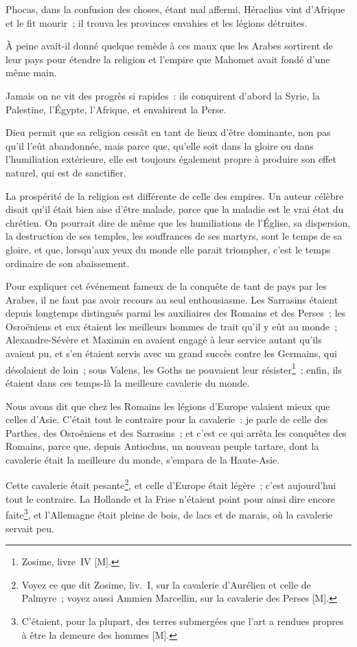 \documentclass[french,twoside]{book} %
\newcommand\chaptercont{} %
\begin{document}
\chaptercont
\noindent Phocas, dans la confusion des choses, étant mal affermi, Héraclius vint d’Afrique et le fit mourir ; il trouva les provinces envahies et les légions détruites.\par
À peine avait-il donné quelque remède à ces maux que les Arabes sortirent de leur pays pour étendre la religion et l’empire que Mahomet avait fondé d’une même main.\par
Jamais on ne vit des progrès si rapides : ils conquirent d’abord la Syrie, la Palestine, l’Égypte, l’Afrique, et envahirent la Perse.\par
Dieu permit que sa religion cessât en tant de lieux d’être dominante, non pas qu’il l’eût abandonnée, mais parce que, qu’elle soit dans la gloire ou dans l’humiliation extérieure, elle est toujours également propre à produire son effet naturel, qui est de sanctifier.\par
La prospérité de la religion est différente de celle des empires. Un auteur célèbre disait qu’il était bien aise d’être malade, parce que la maladie est le vrai état du chrétien. On pourrait dire de même que les humiliations de l’Église, sa dispersion, la destruction de ses temples, les souffrances de ses martyrs, sont le temps de sa gloire, et que, lorsqu’aux yeux du monde elle parait triompher, c’est le temps ordinaire de son abaissement.\par
Pour expliquer cet événement fameux de la conquête de tant de pays par les Arabes, il ne faut pas avoir recours au seul enthousiasme. Les Sarrasins étaient depuis longtemps distingués parmi les auxiliaires des Romains et des Perses ; les Osroëniens et eux étaient les meilleurs hommes de trait qu’il y eût au monde ; Alexandre-Sévère et Maximin en avaient engagé à leur service autant qu’ils avaient pu, et s’en étaient servis avec un grand succès contre les Germains, qui désolaient de loin ; sous Valens, les Goths ne pouvaient leur résister\footnote{Zosime, livre IV [M].} ; enfin, ils étaient dans ces temps-là la meilleure cavalerie du monde.\par
Nous avons dit que chez les Romains les légions d’Europe valaient mieux que celles d’Asie. C’était tout le contraire pour la cavalerie : je parle de celle des Parthes, des Osroëniens et des Sarrasins ; et c’est ce qui arrêta les conquêtes des Romains, parce que, depuis Antiochus, un nouveau peuple tartare, dont la cavalerie était la meilleure du monde, s’empara de la Haute-Asie.\par
Cette cavalerie était pesante\footnote{Voyez ce que dit Zosime, liv. I, sur la cavalerie d’Aurélien et celle de Palmyre ; voyez aussi Ammien Marcellin, sur la cavalerie des Perses [M].}, et celle d’Europe était légère ; c’est aujourd’hui tout le contraire. La Hollande et la Frise n’étaient point pour ainsi dire encore faite\footnote{C’étaient, pour la plupart, des terres submergées que l’art a rendues propres à être la demeure des hommes [M].}, et l’Allemagne était pleine de bois, de lacs et de marais, où la cavalerie servait peu.\par
\end{document}
